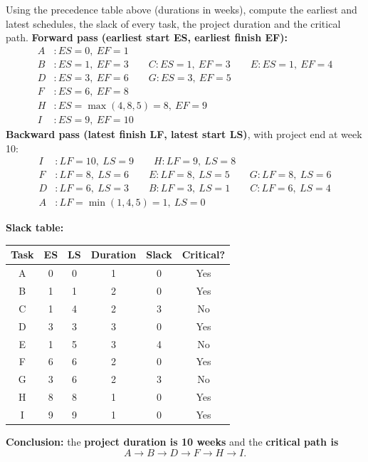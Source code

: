\documentclass[11pt]{article}
\begin{document}
\begin{exoresolu}
Using the precedence table above (durations in weeks), compute the earliest and latest schedules, the slack of every task, the project duration and the critical path.
\tcblower
\textbf{Forward pass (earliest start ES, earliest finish EF):}
\begin{align*}
A &: ES=0,\ EF=1\\
B &: ES=1,\ EF=3 \qquad C: ES=1,\ EF=3 \qquad E: ES=1,\ EF=4\\
D &: ES=3,\ EF=6 \qquad G: ES=3,\ EF=5\\
F &: ES=6,\ EF=8\\
H &: ES=\max(4,8,5)=8,\ EF=9\\
I &: ES=9,\ EF=10
\end{align*}
\textbf{Backward pass (latest finish LF, latest start LS)}, with project end at week 10:
\begin{align*}
I &: LF=10,\ LS=9 \qquad H: LF=9,\ LS=8\\
F &: LF=8,\ LS=6 \qquad E: LF=8,\ LS=5 \qquad G: LF=8,\ LS=6\\
D &: LF=6,\ LS=3 \qquad B: LF=3,\ LS=1 \qquad C: LF=6,\ LS=4\\
A &: LF=\min(1,4,5)=1,\ LS=0
\end{align*}

\textbf{Slack table:}
\begin{center}
\begin{tabular}{|c|c|c|c|c|c|}
\hline
\rowcolor{popblueL} Task & ES & LS & Duration & Slack & Critical? \\
\hline
A & 0 & 0 & 1 & 0 & Yes \\
B & 1 & 1 & 2 & 0 & Yes \\
C & 1 & 4 & 2 & 3 & No \\
D & 3 & 3 & 3 & 0 & Yes \\
E & 1 & 5 & 3 & 4 & No \\
F & 6 & 6 & 2 & 0 & Yes \\
G & 3 & 6 & 2 & 3 & No \\
H & 8 & 8 & 1 & 0 & Yes \\
I & 9 & 9 & 1 & 0 & Yes \\
\hline
\end{tabular}
\end{center}
\textbf{Conclusion:} the \textbf{project duration is 10 weeks} and the \textbf{critical path is}
\[ A \rightarrow B \rightarrow D \rightarrow F \rightarrow H \rightarrow I. \]
\end{exoresolu}
\end{document}

